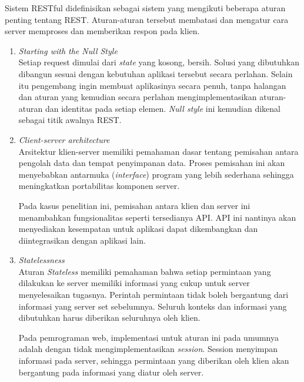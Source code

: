     Sistem RESTful didefinisikan sebagai sistem yang mengikuti beberapa aturan penting tentang REST\cite{rest:restful-web-service}. Aturan-aturan tersebut membatasi dan mengatur cara server memproses dan memberikan respon pada klien.
    \begin{enumerate}
        \item \textit{Starting with the Null Style}\\
            Setiap request dimulai dari \textit{state} yang kosong, bersih. Solusi yang dibutuhkan dibangun sesuai dengan kebutuhan aplikasi tersebut secara perlahan. Selain itu pengembang ingin membuat aplikasinya secara penuh, tanpa halangan dan aturan yang kemudian secara perlahan mengimplementasikan aturan-aturan dan identitas pada setiap elemen.
            \textit{Null style} ini kemudian dikenal sebagai titik awalnya REST.
            
        \item \textit{Client-server architecture}\\
            Arsitektur klien-server memiliki pemahaman dasar tentang pemisahan antara pengolah data dan tempat penyimpanan data. Proses pemisahan ini akan menyebabkan antarmuka (\textit{interface}) program yang lebih sederhana sehingga meningkatkan portabilitas komponen server.
            
            Pada kasus penelitian ini, pemisahan antara klien dan server ini menambahkan fungsionalitas seperti tersedianya API. API ini nantinya akan menyediakan kesempatan untuk aplikasi dapat dikembangkan dan diintegrasikan dengan aplikasi lain.
            
        \item \textit{Statelessness}\\
            Aturan \textit{Stateless} memiliki pemahaman bahwa setiap permintaan yang dilakukan ke server memiliki informasi yang cukup untuk server menyelesaikan tugasnya. Perintah permintaan tidak boleh bergantung dari informasi yang server set sebelumnya. Seluruh konteks dan informasi yang dibutuhkan harus diberikan seluruhnya oleh klien.
            
            
            Pada pemrograman web, implementasi untuk aturan ini pada umumnya adalah dengan tidak mengimplementasikan \textit{session}. Session menyimpan informasi pada server, sehingga permintaan yang diberikan oleh klien akan bergantung pada informasi yang diatur oleh server.
        

\end{enumerate}
